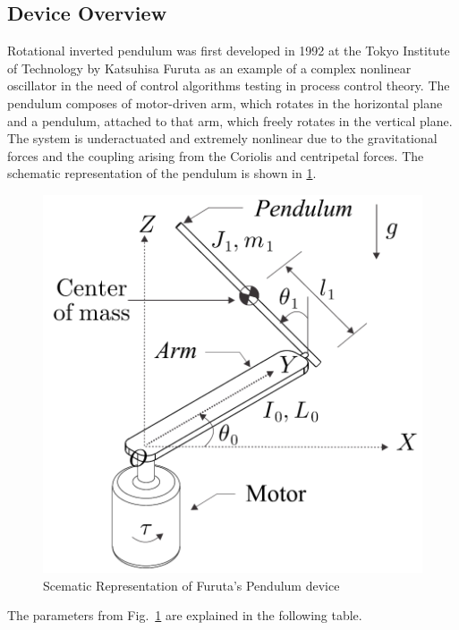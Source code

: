 \subsection{Device Overview}
Rotational inverted pendulum was first developed in 1992 at the Tokyo Institute of Technology by Katsuhisa Furuta as an example of a complex nonlinear oscillator in the need of control algorithms testing in process control theory.
The pendulum composes of motor-driven arm, which rotates in the horizontal plane and a pendulum, attached to that arm, which freely rotates in the vertical plane. The system is underactuated and extremely nonlinear due to the gravitational forces and the coupling arising from the Coriolis and centripetal forces. The schematic representation of the pendulum is shown in \ref{furuta:schematic}.
\newpage
\begin{figure}[h]
	\centering
	\includegraphics[width=.6\linewidth]{images/furuta}
	\caption{Scematic Representation of Furuta's Pendulum device}
	\label{furuta:schematic}
\end{figure}
The parameters from Fig.~\ref{furuta:schematic} are explained in the following table.
